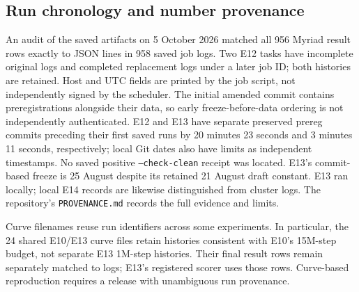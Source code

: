 \subsection{Run chronology and number provenance}
\label{app:provenance}

An audit of the saved artifacts on 5 October 2026 matched all
956 Myriad result rows exactly to JSON lines in 958 saved job logs.
Two E12 tasks have incomplete original logs and completed replacement logs
under a later job ID; both histories are retained. Host and UTC fields are
printed by the job script, not independently signed by the scheduler.
The initial amended commit contains preregistrations alongside their data,
so early freeze-before-data ordering is not independently authenticated.
E12 and E13 have separate preserved prereg commits preceding their first
saved runs by 20 minutes 23 seconds and 3 minutes 11 seconds, respectively;
local Git dates also have limits as independent timestamps. No saved positive
\texttt{--check-clean} receipt was located. E13's commit-based freeze is
25 August despite its retained 21 August draft constant. E13 ran locally;
local E14 records are likewise distinguished from cluster logs. The
repository's \texttt{PROVENANCE.md} records the full evidence and limits.

Curve filenames reuse run identifiers across some experiments. In particular,
the 24 shared E10/E13 curve files retain histories consistent with E10's
15M-step budget, not separate E13 1M-step histories. Their final result rows
remain separately matched to logs; E13's registered scorer uses those rows.
Curve-based reproduction requires a release with unambiguous run provenance.

